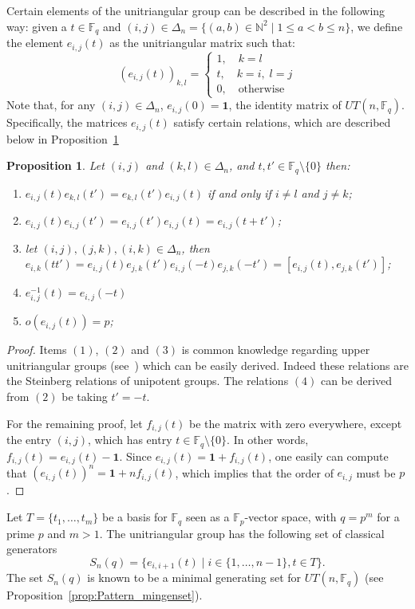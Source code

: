 \documentclass[11pt,letterpaper]{amsart}
\newtheorem{proposition}[theorem]{Proposition}
\newcommand{\FF}{\mathbb{F}}
\begin{document}
Certain elements of the unitriangular group can be described in the following way:  given a $t\in \FF_q$ and $(i,j)\in\Delta_n=\{(a,b)\in\mathbb{N}^2\mid 1\leq a<b\leq n\}$, we define the element $e_{i,j}(t)$ as the unitriangular matrix such that:
$$(e_{i,j}(t))_{k,l}=\begin{cases}
    1,\quad k=l\\
    t,\quad k=i,\;l=j\\
    0,\quad \text{otherwise}
\end{cases}$$
Note that, for any $(i,j)\in\Delta_n$, $e_{i,j}(0) = \mathbf{1}$, the identity matrix of $UT(n,\FF_q)$.
Specifically, the matrices $e_{i,j}(t)$ satisfy certain relations, which are described below in Proposition~\ref{prop:gens_props}

\begin{proposition}\label{prop:gens_props}
    Let $(i,j)$ and $(k,l)\in\Delta_n$, and $t,t'\in \FF_q\setminus\{0\}$ then:
    \begin{enumerate}
        \item $e_{i,j}(t)e_{k,l}(t')=e_{k,l}(t')e_{i,j}(t)$ if and only if $i\neq l$ and $j\neq k$;
        \item $e_{i,j}(t)e_{i,j}(t')=e_{i,j}(t')e_{i,j}(t)=e_{i,j}(t+t')$;
       
        
        \item let $(i,j),(j,k),(i,k)\in \Delta_n$, then $e_{i,k}(tt')=e_{i,j}(t)e_{j,k}(t')e_{i,j}(-t)e_{j,k}(-t')=[e_{i,j}(t),e_{j,k}(t')]$;
        \item $e_{i,j}^{-1}(t) = e_{i,j}(-t)$
        \item $o(e_{i,j}(t)) = p$;
    \end{enumerate}
\end{proposition}
\begin{proof}
    Items $(1)$, $(2)$ and $(3)$ is common knowledge regarding upper unitriangular groups (see~\cite{biss2001presentation, Mahalanobis2013}) which can be easily derived. Indeed these relations are the Steinberg relations of unipotent groups.
    The relations $(4)$ can be derived from $(2)$ be taking $t'=-t$.

    For the remaining proof, let $f_{i,j}(t)$ be the matrix with zero everywhere, except the entry $(i,j)$, which has entry $t\in \FF_q\setminus\{0\}$. In other words, $f_{i,j}(t) = e_{i,j}(t)-\mathbf{1}$.
    Since $e_{i,j}(t)=\mathbf{1}+f_{i,j}(t)$, one easily can compute that $(e_{i,j}(t))^n=\mathbf{1}+nf_{i,j}(t)$, which implies that the order of $e_{i,j}$ must be $p$.
\end{proof}
Let $T = \{t_1,\dots,t_m\}$ be a basis for $\FF_q$ seen as a $\FF_p$-vector space, with $q=p^m$ for a prime $p$ and $m>1$.
The unitriangular group has the following set of classical generators 
$$
S_n(q)=\{e_{i,i+1}(t)\mid i\in \{1,\dots, n-1\}, t\in T\}.
$$
The set $S_n(q)$ is known to be a minimal generating set for $UT(n,\FF_q)$ (see Proposition~\ref{prop:Pattern_mingenset}).
\end{document}
